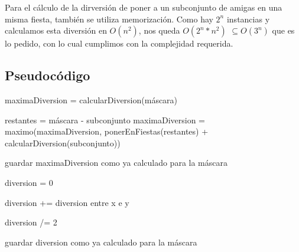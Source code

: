 Para el cálculo de la dirversión de poner a un subconjunto de amigas en una misma fiesta, también se utiliza memorización. Como hay $2^{n}$ instancias y calculamos esta diversión en $O(n^{2})$, nos queda $O(2^{n}*n^{2})$ $\subseteq O(3^{n})$ que es lo pedido, con lo cual cumplimos con la complejidad requerida.

\subsection{Pseudocódigo}

\begin{algorithmic}



    	\State {}
  	\EndIf		

    	\State {}
  	\EndIf	

  \State maximaDiversion = calcularDiversion(máscara) 

  	\State restantes = máscara - subconjunto  
  	\State maximaDiversion = maximo(maximaDiversion, ponerEnFiestas(restantes) + calcularDiversion(subconjunto))
  \EndFor

  \State guardar maximaDiversion como ya calculado para la máscara

 \State {}

\EndFunction

\end{algorithmic}

\vspace{5mm}


\begin{algorithmic}



    	\State {}
  	\EndIf		

  	\State diversion = 0

  			\State diversion += diversion entre x e y
  		\EndFor
  	\EndFor

  	\State diversion /= 2 

  	\State guardar diversion como ya calculado para la máscara

 	\State {}

\EndFunction

\end{algorithmic}